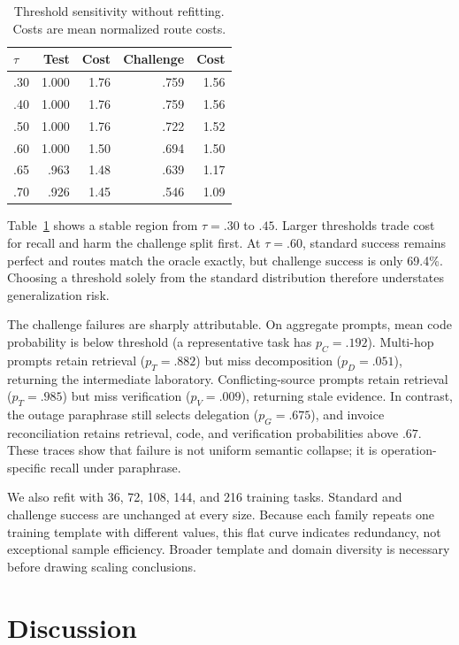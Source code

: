 \documentclass[letterpaper]{article} %
\begin{document}
\begin{table}[t]
\centering
\small
\caption{Threshold sensitivity without refitting. Costs are mean normalized route costs.}
\label{tab:sensitivity}
\begin{tabular}{lrrrr}
\toprule
$\tau$ & Test & Cost & Challenge & Cost \\
\midrule
.30 & 1.000 & 1.76 & .759 & 1.56 \\
.40 & 1.000 & 1.76 & .759 & 1.56 \\
.50 & 1.000 & 1.76 & .722 & 1.52 \\
.60 & 1.000 & 1.50 & .694 & 1.50 \\
.65 & .963 & 1.48 & .639 & 1.17 \\
.70 & .926 & 1.45 & .546 & 1.09 \\
\bottomrule
\end{tabular}
\end{table}

Table~\ref{tab:sensitivity} shows a stable region from $\tau=.30$ to $.45$. Larger thresholds trade cost for recall and harm the challenge split first. At $\tau=.60$, standard success remains perfect and routes match the oracle exactly, but challenge success is only 69.4\%. Choosing a threshold solely from the standard distribution therefore understates generalization risk.

The challenge failures are sharply attributable. On aggregate prompts, mean code probability is below threshold (a representative task has $p_C=.192$). Multi-hop prompts retain retrieval ($p_T=.882$) but miss decomposition ($p_D=.051$), returning the intermediate laboratory. Conflicting-source prompts retain retrieval ($p_T=.985$) but miss verification ($p_V=.009$), returning stale evidence. In contrast, the outage paraphrase still selects delegation ($p_G=.675$), and invoice reconciliation retains retrieval, code, and verification probabilities above $.67$. These traces show that failure is not uniform semantic collapse; it is operation-specific recall under paraphrase.

We also refit with 36, 72, 108, 144, and 216 training tasks. Standard and challenge success are unchanged at every size. Because each family repeats one training template with different values, this flat curve indicates redundancy, not exceptional sample efficiency. Broader template and domain diversity is necessary before drawing scaling conclusions.

\section{Discussion}
\end{document}

